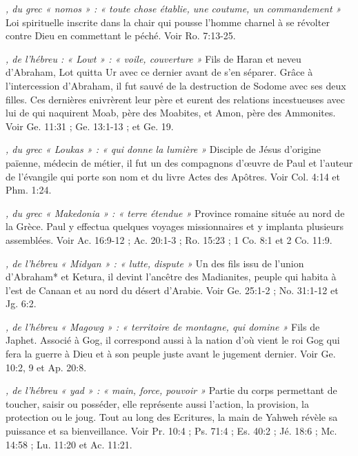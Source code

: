 \begin{multicols}{2}
{\textit{, du grec « nomos » : « toute chose établie, une coutume, un commandement »}\newline
Loi spirituelle inscrite dans la chair qui pousse l'homme charnel à se révolter contre Dieu en commettant le péché. Voir Ro. 7:13-25.

\textit{, de l'hébreu : « Lowt » : « voile, couverture »}\newline
Fils de Haran et neveu d'Abraham, Lot quitta Ur avec ce dernier avant de s'en séparer. Grâce à l'intercession d'Abraham, il fut sauvé de la destruction de Sodome avec ses deux filles. Ces dernières enivrèrent leur père et eurent des relations incestueuses avec lui de qui naquirent Moab, père des Moabites, et Amon, père des Ammonites. Voir Ge. 11:31 ; Ge. 13:1-13 ; et Ge. 19.

\textit{, du grec « Loukas » : « qui donne la lumière »}\newline
Disciple de Jésus d'origine païenne, médecin de métier, il fut un des compagnons d'œuvre de Paul et l'auteur de l'évangile qui porte son nom et du livre Actes des Apôtres. Voir Col. 4:14 et Phm. 1:24.

\textit{, du grec « Makedonia » : « terre étendue »}\newline
Province romaine située au nord de la Grèce. Paul y effectua quelques voyages missionnaires et y implanta plusieurs assemblées. Voir Ac. 16:9-12 ; Ac. 20:1-3 ; Ro. 15:23 ; 1 Co. 8:1 et 2 Co. 11:9.

\textit{, de l'hébreu « Midyan » : « lutte, dispute »}\newline
Un des fils issu de l'union d'Abraham* et Ketura, il devint l'ancêtre des Madianites, peuple qui habita à l'est de Canaan et au nord du désert d'Arabie. Voir Ge. 25:1-2 ; No. 31:1-12 et Jg. 6:2.

\textit{, de l'hébreu « Magowg » : « territoire de montagne, qui domine »}\newline
Fils de Japhet. Associé à Gog, il correspond aussi à la nation d'où vient le roi Gog qui fera la guerre à Dieu et à son peuple juste avant le jugement dernier. Voir Ge. 10:2, 9 et Ap. 20:8.

\textit{, de l'hébreu « yad » : « main, force, pouvoir »}\newline
Partie du corps permettant de toucher, saisir ou posséder, elle représente aussi l'action, la provision, la protection ou le joug. Tout au long des Ecritures, la main de Yahweh révèle sa puissance et sa bienveillance. Voir Pr. 10:4 ; Ps. 71:4 ; Es. 40:2 ; Jé. 18:6 ; Mc. 14:58 ; Lu. 11:20 et Ac. 11:21.

}
\end{multicols}
